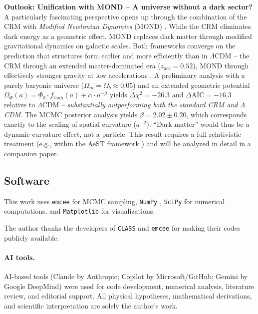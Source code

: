 \documentclass[aps,prd,twocolumn,superscriptaddress,nofootinbib]{revtex4-2}
\begin{document}
\textbf{Outlook: Unification with MOND -- A universe without a dark sector?} A particularly fascinating perspective opens up through the combination of the CRM with \textit{Modified Newtonian Dynamics} (MOND) \cite{Milgrom1983}. While the CRM eliminates dark energy as a geometric effect, MOND replaces dark matter through modified gravitational dynamics on galactic scales. Both frameworks converge on the prediction that structures form earlier and more efficiently than in $\Lambda$CDM -- the CRM through an extended matter-dominated era ($z_{\mathrm{acc}} = 0.52$), MOND through effectively stronger gravity at low accelerations \cite{Asencio2023}. A preliminary analysis with a purely baryonic universe ($\Omega_m = \Omega_b \approx 0.05$) and an extended geometric potential $\Omega_\Phi(a) = \Phi_0 \cdot f_{\mathrm{tanh}}(a) + \alpha \cdot a^{-\beta}$ yields $\Delta\chi^2 = -26.3$ and $\Delta\mathrm{AIC} = -16.3$ relative to $\Lambda$CDM -- \textit{substantially outperforming both the standard CRM and $\Lambda$CDM}. The MCMC posterior analysis yields $\beta = 2.02 \pm 0.20$, which corresponds exactly to the scaling of spatial curvature ($a^{-2}$). ``Dark matter'' would thus be a dynamic curvature effect, not a particle. This result requires a full relativistic treatment (e.g., within the AeST framework \cite{Skordis2021}) and will be analyzed in detail in a companion paper.

\subsection*{Software}

This work uses \texttt{emcee} \cite{ForemanMackey2013} for MCMC sampling, \texttt{NumPy} \cite{Harris2020}, \texttt{SciPy} \cite{Virtanen2020} for numerical computations, and \texttt{Matplotlib} \cite{Hunter2007} for visualizations.

\begin{acknowledgments}
The author thanks the developers of \texttt{CLASS} \cite{Blas2011} and
\texttt{emcee} \cite{ForemanMackey2013} for making their codes publicly
available.

\paragraph{AI tools.}
AI-based tools (Claude by Anthropic; Copilot by Microsoft/GitHub; Gemini by Google DeepMind) were used
for code development, numerical analysis, literature review, and editorial
support. All physical hypotheses, mathematical derivations, and scientific
interpretation are solely the author's work.
\end{acknowledgments}
\end{document}
